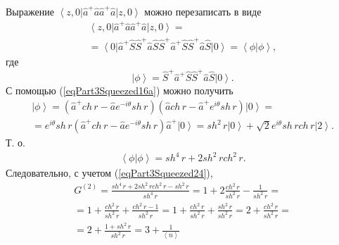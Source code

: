 Выражение
$\left<z,0\right|\hat{a}^{+}\hat{a}\hat{a}^{+}\hat{a}\left|z,0\right>$
можно перезаписать в виде
\begin{eqnarray}
  \left<z,0\right|\hat{a}^{+}\hat{a}\hat{a}^{+}\hat{a}\left|z,0\right>
  = \nonumber \\
  =
  \left<0\right|\hat{a}^{+}\hat{S}\hat{S}^{+}\hat{a}\hat{S}\hat{S}^{+}\hat{a}^{+}\hat{S}\hat{S}^{+}\hat{a}\hat{S}\left|0\right>
  = \left<\phi\right.\left|\phi\right>,
  \nonumber
\end{eqnarray}
где
\[
\left|\phi\right> = \hat{S}^{+}\hat{a}^{+}\hat{S}\hat{S}^{+}\hat{a}\hat{S}\left|0\right>.
\]
С помощью (\ref{eqPart3Squeezed16a}) можно получить
\begin{eqnarray}
  \left|\phi\right> =  
  \left(\hat{a}^{+} ch\,r - \hat{a} e^{-i\theta} sh \, r\right)
  \left(\hat{a} ch\,r - \hat{a}^{+} e^{i\theta} sh \, r\right)
  \left|0\right> =
  \nonumber \\
  =
   e^{i\theta} sh \, r \left(\hat{a}^{+} ch\,r - \hat{a} e^{-i\theta} sh \, r\right)
   \hat{a}^{+}\left|0\right> =
   sh^2 \, r \left|0\right> + \sqrt{2} e^{i\theta}  sh \, r ch \, r\left|2\right>.
  \nonumber
\end{eqnarray}
Т. о.
\begin{eqnarray}
  \left<\phi\right.\left|\phi\right> =
  sh^4 \, r + 2 sh^2 \, r ch^2 \, r.
  \nonumber
\end{eqnarray}
Следовательно, с учетом (\ref{eqPart3Squeezed24}),
\begin{eqnarray}
G^{(2)} = \frac{sh^4 \, r + 2 sh^2 \, r ch^2 \, r - sh^2 \, r}{sh^4 \,
  r} = 1 + 2 \frac{ch^2 \, r}{sh^2 \, r} - \frac{1}{sh^2 \, r} =
\nonumber \\
=
1 + \frac{ch^2 \, r}{sh^2 \, r} + \frac{ch^2 \, r - 1}{sh^2 \, r} =
1 + \frac{ch^2 \, r}{sh^2 \, r} + \frac{sh^2 \, r }{sh^2 \, r} =
2 + \frac{ch^2 \, r}{sh^2 \, r} =
\nonumber \\
= 2 + \frac{1 + sh^2 \, r}{sh^2 \, r} = 3 + \frac{1}{\left<n\right>}
\nonumber
\end{eqnarray}

